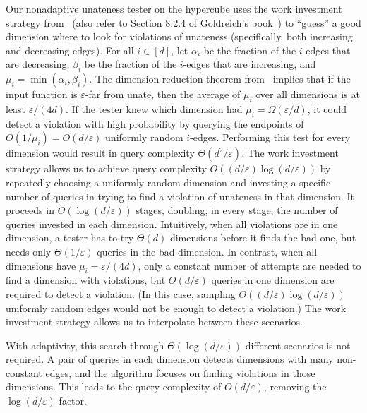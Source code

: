\documentclass{toc}
\newcommand{\eps}{\varepsilon}
\begin{document}
Our nonadaptive unateness tester on the hypercube uses the work investment strategy from~\cite{BerRY14} (also refer to Section 8.2.4 of Goldreich's book~\cite{Go-book}) to ``guess'' a good dimension where to look for violations of unateness (specifically, both increasing and decreasing edges).  For all $i\in[d]$, let $\alpha_i$ be the fraction of the $i$-edges that are decreasing, $\beta_i$ be the fraction of the $i$-edges that are increasing, and $\mu_i = \min(\alpha_i,\beta_i)$. The dimension reduction theorem from~\cite{CDJS17} implies that if the input function is $\eps$-far from unate, then the average of $\mu_i$ over all dimensions is at least $\eps/({4d})$. If the tester knew which dimension had $\mu_i=\Omega(\eps/d)$, it could detect a violation with high probability by querying the endpoints of $O(1/\mu_i)=O(d/\eps)$ uniformly random $i$-edges.
Performing this test for every dimension would result in query complexity $\Theta(d^2/\eps)$. The work investment strategy allows us to achieve query complexity $O((d/\eps) \log (d/\eps))$ by repeatedly choosing a uniformly random dimension and investing a specific number of queries in trying to find a violation of unateness in that dimension. It proceeds in $\Theta(\log (d/\eps))$ stages, doubling, in every stage, the number of queries invested in each dimension. Intuitively, when all violations are in one dimension, a tester has to try $\Theta(d)$ dimensions before it finds the bad one, but needs only $\Theta(1/\eps)$ queries in the bad dimension. In contrast, when all dimensions have $\mu_i=\eps/(4d)$, only a constant number of attempts are needed to find a dimension with violations, but $\Theta(d/\eps)$ queries in one dimension are required to detect a violation. (In this case, sampling $\Theta((d/\eps) \log (d/\eps))$ uniformly random edges would not be enough to detect a violation.) The work investment strategy allows us to interpolate between these scenarios.

%
%
%
%

With adaptivity, this search  through $\Theta(\log (d/\eps))$ different scenarios is not required.
A pair of queries in each dimension detects dimensions with many non-constant edges, and the algorithm focuses
on finding violations in those dimensions. This leads to the query complexity of $O(d/\eps)$, removing the $\log (d/\eps)$ factor.
\end{document}
